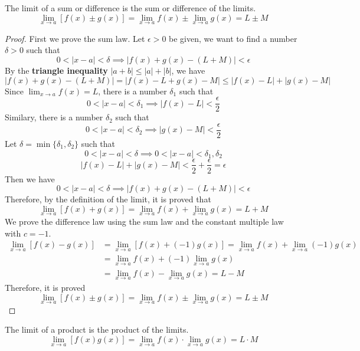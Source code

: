 \begin{theorem}
    The limit of a sum or difference is the sum or difference of the limits.
    \[\lim_{x\to a}[f(x)\pm g(x)]=\lim_{x\to a}f(x)\pm\lim_{x\to a}g(x)=L\pm M\]
\end{theorem}
\begin{proof}
    First we prove the sum law.
    Let \(\epsilon>0\) be given, we want to find a number \(\delta>0\) such
    that \[0<|x-a|<\delta\implies|f(x)+g(x)-(L+M)|<\epsilon\]
    By the \textbf{triangle inequality} \(|a+b|\leq|a|+|b|\), we have
    \[|f(x)+g(x)-(L+M)|=|f(x)-L+g(x)-M|\leq|f(x)-L|+|g(x)-M|\]
    Since \(\lim_{x\to a}f(x)=L\), there is a number \(\delta_1\) such that
    \[0<|x-a|<\delta_1\implies|f(x)-L|<\frac{\epsilon}{2}\]
    Similary, there is a number \(\delta_2\) such that
    \[0<|x-a|<\delta_2\implies|g(x)-M|<\frac{\epsilon}{2}\]
    Let \(\delta=\min\{\delta_1,\delta_2\}\) such that
    \[0<|x-a|<\delta\implies0<|x-a|<\delta_1,\delta_2\]
    \[|f(x)-L|+|g(x)-M|<\frac{\epsilon}{2}+\frac{\epsilon}{2}=\epsilon\]
    Then we have \[0<|x-a|<\delta\implies|f(x)+g(x)-(L+M)|<\epsilon\]
    Therefore, by the definition of the limit, it is proved that
    \[\lim_{x\to a}[f(x)+g(x)]=\lim_{x\to a}f(x)+\lim_{x\to a}g(x)=L+M\]
    We prove the difference law using the sum law and the constant multiple
    law with \(c=-1\).
    \begin{align*}
        \lim_{x\to a}[f(x)-g(x)]&=\lim_{x\to a}[f(x)+(-1)g(x)]
        =\lim_{x\to a}f(x)+\lim_{x\to a}(-1)g(x) \\
        &=\lim_{x\to a}f(x)+(-1)\lim_{x\to a}g(x) \\
        &=\lim_{x\to a}f(x)-\lim_{x\to a}g(x) = L-M
    \end{align*}
    Therefore, it is proved
    \[\lim_{x\to a}[f(x)\pm g(x)]=\lim_{x\to a}f(x)\pm\lim_{x\to a}g(x)=L\pm M\]
\end{proof}
\begin{theorem}
    The limit of a product is the product of the limits.
    \[\lim_{x\to a}[f(x)g(x)]=\lim_{x\to a}f(x)\cdot\lim_{x\to a}g(x)=L\cdot M\]
\end{theorem}
